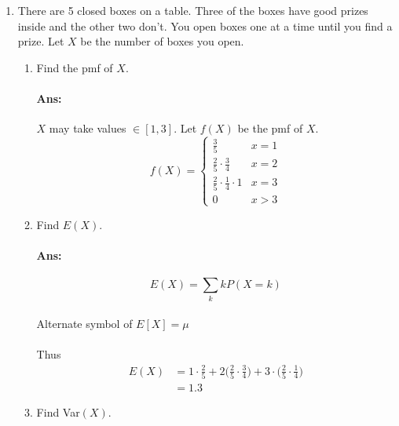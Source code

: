 \documentclass[letterpaper,12pt]{article}
\begin{document}
\begin{enumerate}
    \item There are 5 closed boxes on a table. Three of the boxes have good prizes inside and the
other two don’t. You open boxes one at a time until you find a prize. Let $X$ be the
number of boxes you open.
    \begin{enumerate}[label=(\alph*).]
        \item Find the pmf of $X$.
            \paragraph{Ans:} $X$ may take values $\in [1,3]$. Let $f(X)$ be the pmf of $X$.
            \[ f(X) = \begin{cases}
                \frac{3}{5}& x = 1\\
                \frac{2}{5}\cdot\frac{3}{4}& x = 2 \\
                \frac{2}{5} \cdot \frac{1}{4} \cdot 1 & x = 3 \\
                0 & x > 3
                \end{cases}
            \]
        \item Find $E(X)$.
            \paragraph{Ans:} 
            \begin{equation}
                E(X) = \sum_k k P(X=k)
            \end{equation}
            \paragraph{}Alternate symbol of $E[X] = \mu$
            \paragraph{}Thus
            \begin{align*}
                E(X) &= 1\cdot\frac{2}{5} + 2\bigg(\frac{2}{5}\cdot \frac{3}{4}\bigg) + 3\cdot\bigg(\frac{2}{5} \cdot \frac{1}{4}\bigg)\\
                     &= 1.3
            \end{align*}
        \item Find Var$(X)$.

\end{enumerate}
\end{enumerate}
\end{document}

